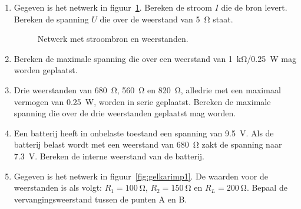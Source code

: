 \begin{enumerate}[labelindent=0pt,labelwidth=\widthof{8.88.\ },label=\textbf{\thechapter.\arabic*.},leftmargin=!,ref=\thechapter.\arabic*]
\item
\label{que:gelspanningsdeling2}
Gegeven is het netwerk in figuur~\ref{fig:gelspanningsdeling3}. Bereken de stroom $I$ die de bron levert.
Bereken de spanning $U$ die over de weerstand van \SI{5}{\ohm} staat.
\begin{figure}[!ht]
\centering
{}
\caption{Netwerk met stroombron en weerstanden.}
\label{fig:gelspanningsdeling3}
\end{figure}

\item
\label{que:gelmaxspanning1}
Bereken de maximale spanning die over een weerstand van \SI{1}{\kilo\ohm}/\SI{ 0.25}{\watt} mag worden geplaatst.


\item
\label{que:gelmaxspanning2}
Drie weerstanden van \SI{680}{\ohm}, \SI{560}{\ohm} en \SI{820}{\ohm}, alledrie met een maximaal vermogen van \SI{0.25}{\watt}, worden in serie geplaatst. Bereken de maximale spanning die over de drie weerstanden geplaatst mag worden.


\item
\label{que:gelinterneweerstand1}
Een batterij heeft in onbelaste toestand een spanning van \SI{9.5}{\volt}. Als de batterij belast wordt met een weerstand van \SI{680}{\ohm} zakt de spanning naar \SI{7.3}{\volt}. Bereken de interne weerstand van de batterij.


\item
\label{que:gelkarimp1}
Gegeven is het netwerk in figuur~\ref{fig:gelkarimp1}. De waarden voor de weerstanden is als volgt: $R_1 = \SI{100}{\ohm}$, $R_2 = \SI{150}{\ohm}$ en $R_L = \SI{200}{\ohm}$. Bepaal de vervangingsweerstand tussen de punten A en B.


\end{enumerate}
